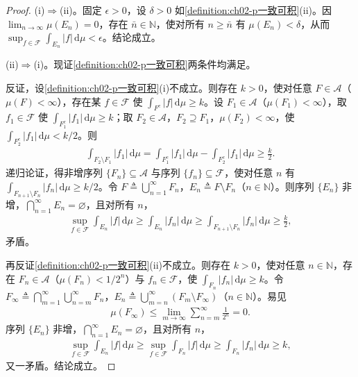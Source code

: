 \documentclass[../../main.tex]{subfiles}%
\begin{document}
\begin{proof}
(i)$\Rightarrow$(ii)。固定 $\epsilon>0$，设 $\delta>0$ 如\cref{definition:ch02-p一致可积}(ii)。因 $\lim_{n\to\infty}\mu(E_n)=0$，存在 $\bar n\in\mathbb N$，使对所有 $n\geqslant\bar n$ 有 $\mu(E_n)<\delta$，从而 $\sup_{f\in\mathscr F}\int_{E_n}|f|\,\mathrm{d}\mu<\epsilon$。结论成立。

(ii)$\Rightarrow$(i)。现证\cref{definition:ch02-p一致可积}两条件均满足。

反证，设\cref{definition:ch02-p一致可积}(i)不成立。则存在 $k>0$，使对任意 $F\in\mathscr A$（$\mu(F)<\infty$），存在某 $f\in\mathscr F$ 使 $\int_{F^c}|f|\,\mathrm{d}\mu\geqslant k$。设 $F_1\in\mathscr A$（$\mu(F_1)<\infty$），取 $f_1\in\mathscr F$ 使 $\int_{F_1^c}|f_1|\,\mathrm{d}\mu\geqslant k$；取 $F_2\in\mathscr A$，$F_2\supseteq F_1$，$\mu(F_2)<\infty$，使 $\int_{F_2^c}|f_1|\,\mathrm{d}\mu<k/2$。则
\begin{align*}
\int_{F_2\setminus F_1}|f_1|\,\mathrm{d}\mu=\int_{F_1^c}|f_1|\,\mathrm{d}\mu-\int_{F_2^c}|f_1|\,\mathrm{d}\mu\geqslant\frac k2.
\end{align*}
递归论证，得非增序列 $\{F_n\}\subseteq\mathscr A$ 与序列 $\{f_n\}\subseteq\mathscr F$，使对任意 $n$ 有 $\int_{F_{n+1}\setminus F_n}|f_n|\,\mathrm{d}\mu\geqslant k/2$。令 $F\triangleq \bigcup_{n=1}^\infty F_n$，$E_n\triangleq F\setminus F_n$（$n\in\mathbb N$）。则序列 $\{E_n\}$ 非增，$\bigcap_{n=1}^\infty E_n=\varnothing $，且对所有 $n$，
\begin{align*}
\sup_{f\in\mathscr F}\int_{E_n}|f|\,\mathrm{d}\mu\geqslant\int_{E_n}|f_n|\,\mathrm{d}\mu
\geqslant\int_{F_{n+1}\setminus F_n}|f_n|\,\mathrm{d}\mu\geqslant\frac k2,
\end{align*}
矛盾。

再反证\cref{definition:ch02-p一致可积}(ii)不成立。则存在 $k>0$，使对任意 $n\in\mathbb N$，存在 $F_n\in\mathscr A$（$\mu(F_n)<1/2^n$）与 $f_n\in\mathscr F$，使 $\int_{F_n}|f_n|\,\mathrm{d}\mu\geqslant k$。令 $F_\infty\triangleq \bigcap_{m=1}^\infty\bigcup_{n=m}^\infty F_n$，$E_n\triangleq \bigcup_{m=n}^\infty(F_m\setminus F_\infty)$（$n\in\mathbb N$）。易见
\begin{align*}
\mu(F_\infty)\leqslant\lim_{m\to\infty}\sum_{n=m}^\infty\frac1{2^n}=0.
\end{align*}
序列 $\{E_n\}$ 非增，$\bigcap_{n=1}^\infty E_n=\varnothing $，且对所有 $n$，
\begin{align*}
\sup_{f\in\mathscr F}\int_{E_n}|f|\,\mathrm{d}\mu
\geqslant\sup_{f\in\mathscr F}\int_{F_n}|f|\,\mathrm{d}\mu
\geqslant\int_{F_n}|f_n|\,\mathrm{d}\mu\geqslant k,
\end{align*}
又一矛盾。结论成立。
\end{proof}
\end{document}

